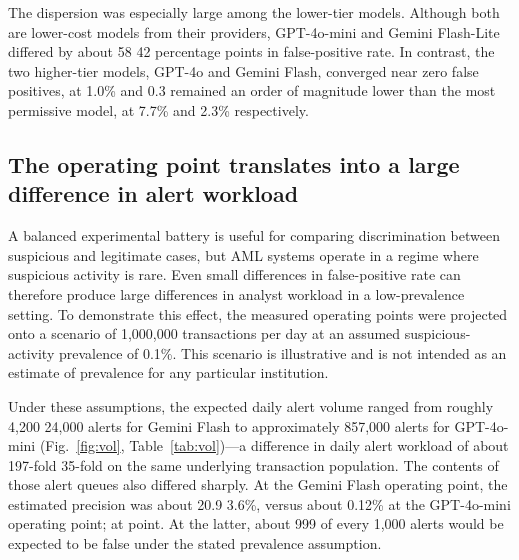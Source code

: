 \documentclass[pdflatex,sn-basic,Numbered]{sn-jnl}
\newcommand{\HLtext}[1]{\texthl{#1}}
\newcommand{\HLdel}[1]{\textcolor{HLink}{\sout{#1}}}
\renewcommand{\HLtext}[1]{#1}\renewcommand{\HLdel}[1]{#1}%
\begin{document}
The dispersion was especially large among the lower-tier models. Although both are lower-cost models from their providers, GPT-4o-mini and Gemini Flash-Lite differed by about \HLdel{58} \HLtext{42} percentage points in false-positive rate. In contrast, the two higher-tier models, GPT-4o and Gemini Flash, \HLdel{converged near zero false positives, at 1.0\% and 0.3} \HLtext{remained an order of magnitude lower than the most permissive model, at 7.7}\% \HLtext{and 2.3}\% respectively.

\subsection{The operating point translates into a large difference in alert workload}\label{sec:volume}

A balanced experimental battery is useful for comparing discrimination between suspicious and legitimate cases, but AML systems operate in a regime where suspicious activity is rare. Even small differences in false-positive rate can therefore produce large differences in analyst workload in a low-prevalence setting. To demonstrate this effect, the measured operating points were projected onto a scenario of 1,000,000 transactions per day at an assumed suspicious-activity prevalence of 0.1\%. This scenario is illustrative and is not intended as an estimate of prevalence for any particular institution.

Under these assumptions, the expected daily alert volume ranged from roughly \HLdel{4,200} \HLtext{24,000} alerts for Gemini Flash to approximately \HLtext{857,000 alerts for GPT-4o-mini} (Fig.~\ref{fig:vol}\HLtext{,} Table~\ref{tab:vol})---a difference in daily alert workload of about \HLdel{197-fold} \HLtext{35-fold} on the same underlying transaction population. The contents of those alert queues also differed sharply. At the Gemini Flash operating point, the estimated precision was about \HLdel{20.9} \HLtext{3.6}\%, versus about 0.12\% at the GPT-4o-mini operating \HLdel{point; at} \HLtext{point. At} the latter, about 999 of every 1,000 alerts would be expected to be false under the stated prevalence assumption.
\end{document}
